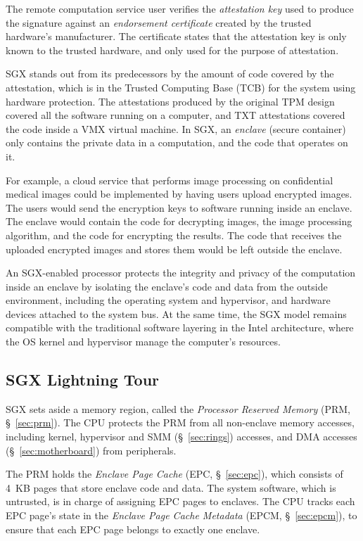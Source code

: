 The remote computation service user verifies the \textit{attestation key} used
to produce the signature against an \textit{endorsement certificate} created by
the trusted hardware's manufacturer. The certificate states that the
attestation key is only known to the trusted hardware, and only used for the
purpose of attestation.

SGX stands out from its predecessors by the amount of code covered by the
attestation, which is in the Trusted Computing Base (TCB) for the system using
hardware protection. The attestations produced by the original TPM design
covered all the software running on a computer, and TXT attestations covered
the code inside a VMX \cite{uhlig2005vmx} virtual machine. In SGX, an
\textit{enclave} (secure container) only contains the private data in a
computation, and the code that operates on it.

For example, a cloud service that performs image processing on confidential
medical images could be implemented by having users upload encrypted images.
The users would send the encryption keys to software running inside an enclave.
The enclave would contain the code for decrypting images, the image processing
algorithm, and the code for encrypting the results. The code that receives the
uploaded encrypted images and stores them would be left outside the enclave.

An SGX-enabled processor protects the integrity and privacy of the computation
inside an enclave by isolating the enclave's code and data from the outside
environment, including the operating system and hypervisor, and hardware
devices attached to the system bus. At the same time, the SGX model remains
compatible with the traditional software layering in the Intel architecture,
where the OS kernel and hypervisor manage the computer's resources.


\subsection{SGX Lightning Tour}
\label{sec:intro_sgx}

SGX sets aside a memory region, called the \textit{Processor Reserved Memory}
(PRM, \S~\ref{sec:prm}). The CPU protects the PRM from all non-enclave memory
accesses, including kernel, hypervisor and SMM (\S~\ref{sec:rings}) accesses,
and DMA accesses (\S~\ref{sec:motherboard}) from peripherals.

The PRM holds the \textit{Enclave Page Cache} (EPC, \S~\ref{sec:epc}), which
consists of 4~KB pages that store enclave code and data. The system software,
which is untrusted, is in charge of assigning EPC pages to enclaves. The CPU
tracks each EPC page's state in the \textit{Enclave Page Cache Metadata} (EPCM,
\S~\ref{sec:epcm}), to ensure that each EPC page belongs to exactly one
enclave.

